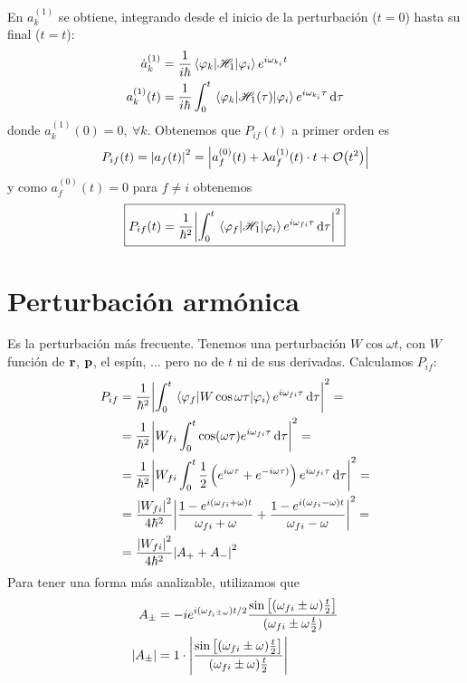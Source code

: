 En $a_k^{(1)}$ se obtiene, integrando desde el inicio de la
perturbación ($t=0$) hasta su final ($t=t$):
\begin{equation}
  \begin{split}
    \dot{a}_k^{(1)} &= \frac{1}{i \hbar} \matrixel{\varphi_k}{\Ham_1}{\varphi_i}
    e^{i\omega_{k_i}t}\\
    a_k^{(1)}(t) &= \frac{1}{i \hbar} \int_0^t \matrixel{\varphi_k}{\Ham_1(\tau)}{\varphi_i}
    e^{i\omega_{k_i}\tau} \dd{\tau}
  \end{split}
\end{equation}
donde $a_k^{(1)}(0)=0, \ \forall k$. Obtenemos que $P_{if}(t)$ a
primer orden es
\begin{equation}
  P_{if}(t)= \abs{a_f(t)}^2 = \abs{a_f^{(0)}(t) + \lambda a_f^{(1)}(t)\cdot
    t + \order{t^2}}
\end{equation}
y como $a_f^{(0)}(t)=0$ para $f\neq i$ obtenemos
\begin{equation}
  \boxed{
  P_{if}(t) = \frac{1}{\hbar^2} \abs{ \int_0^t
    \matrixel{\varphi_f}{\Ham_1}{\varphi_i} e^{i \omega_{fi} \tau}\dd{\tau} }^2
}
\end{equation}

\section{Perturbación armónica}
Es la perturbación más frecuente. Tenemos una perturbación $W\cos \omega
t$, con $W$ función de $\bm{\mathrm{r}}$, $\bm{\mathrm{p}}$, el espín, ...
 pero no de $t$ ni de sus
derivadas. Calculamos $P_{if}$:
\begin{equation}
  \begin{split}
    P_{if} &= \frac{1}{\hbar^2} \abs{\int_0^t \mel{\varphi_f}{W \cos \omega \tau}{\varphi_i}
      e^{i\omega_{fi}\tau}\dd{\tau}}^2 = \\
    &= \frac{1}{\hbar^2} \abs{W_{fi}
      \int_0^t \cos ( \omega \tau) e^{i\omega_{fi}\tau}\dd{\tau}}^2 = \\
    &= \frac{1}{\hbar^2} \abs{W_{fi}
      \int_0^t \frac{1}{2} \left(
          e^{i\omega\tau}+e^{-i\omega\tau)} \right)
        e^{i\omega_{fi}\tau}\dd{\tau}}^2 = \\
      &= \frac{\abs{W_{fi}}^2}{4 \hbar^2} \abs{ 
        \frac{1- e^{i(\omega_{fi}+\omega)t}}{\omega_{fi}+\omega} 
        +
        \frac{1- e^{i(\omega_{fi}-\omega)t}}{\omega_{fi}-\omega} 
      }^2=  \\
      &= \frac{\abs{W_{fi}}^2}{4 \hbar^2} \abs{ A_+ + A_-}^2
  \end{split}
\end{equation}
Para tener una forma más analizable, utilizamos que
\begin{align}
  A_\pm &= -i e^{i (\omega_{f_i \pm \omega}) t/2} \frac{\sin \left[  
    (\omega_{fi}\pm \omega)\frac{t}{2} 
\right]
}{(\omega_{fi}\pm \omega
          \frac{t}{2})} \\
  \abs{A_\pm} &= 1\cdot \abs{ \frac{\sin \left[  
    (\omega_{fi}\pm \omega)\frac{t}{2} 
\right]
}{(\omega_{fi}\pm \omega
          )\frac{t}{2}} }
\end{align}

